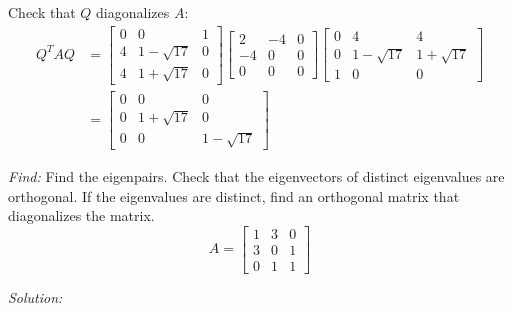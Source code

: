 \documentclass[11pt]{homework}
\begin{document}
Check that $Q$ diagonalizes $A$:
\begin{align*}
Q^T A Q &=
  \begin{bmatrix}
  0 & 0 & 1 \\
  4 & 1-\sqrt{17} & 0 \\
  4 & 1+\sqrt{17} & 0 
  \end{bmatrix}
  \begin{bmatrix}
  2 & -4 & 0 \\
  -4 & 0 & 0 \\
  0 &  0 & 0
  \end{bmatrix}
  \begin{bmatrix}
  0 & 4 & 4 \\ 
  0 & 1- \sqrt{17} & 1+\sqrt{17} \\
  1 & 0 & 0
  \end{bmatrix} \\
  &=
  \begin{bmatrix}
  0 & 0 & 0 \\
  0 & 1+\sqrt{17} & 0 \\
  0 & 0 & 1-\sqrt{17}
  \end{bmatrix}
\end{align*}

\newpage
\question
\emph{Find:}
\newline
Find the eigenpairs.
Check that the eigenvectors of distinct eigenvalues are orthogonal.
If the eigenvalues are distinct, find an orthogonal matrix that diagonalizes the matrix.
\begin{equation*}
A = 
  \begin{bmatrix}
  1 & 3 & 0 \\
  3 & 0 & 1 \\
  0 & 1 & 1
  \end{bmatrix}
\end{equation*}

\emph{Solution:}
\newline
\end{document}
